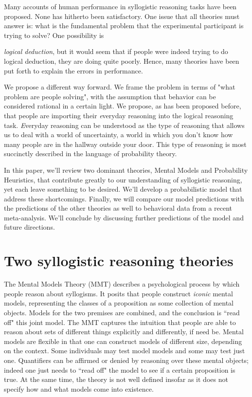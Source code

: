 \documentclass[10pt,letterpaper]{article}
\begin{document}
Many accounts of human performance in syllogistic reasoning tasks have been proposed. None has hitherto been satisfactory. One issue that all theories must answer is: what is the fundamental problem that the experimental participant is trying to solve? One possibility is {\emph{logical deduction}, but it would seem that if people were indeed trying to do logical deduction, they are doing quite poorly. Hence, many theories have been put forth to explain the errors in performance.

We propose a different way forward. We frame the problem in terms of "what problem are people solving", with the assumption that behavior can be considered rational in a certain light. We propose, as has been proposed before, that people are importing their {\emph everyday} reasoning into the logical reasoning task. {\emph Everyday} reasoning can be understood as the type of reasoning that allows us to deal with a world of uncertainty, a world in which you don't know how many people are in the hallway outside your door. This type of reasoning is most succinctly described in the language of probability theory. 

In this paper, we'll review two dominant theories, Mental Models and Probability Heuristics, that contribute greatly to our understanding of syllogistic reasoning, yet each leave something to be desired. We'll develop a probabilistic model that address these shortcomings.  Finally, we will compare our model predictions with the predictions of the other theories as well to behavioral data from a recent meta-analysis. We'll conclude by discussing further predictions of the model and future directions.  


\section{Two syllogistic reasoning theories}

The Mental Models Theory (MMT) describes a psychological process by which people reason about syllogisms. It posits that people construct {\em iconic} mental models, representing the classes of a proposition as some collection of mental objects. Models for the two premises are combined, and the conclusion is ``read off" this joint model. The MMT captures the intuition that people are able to reason about sets of different things explicitly and differently, if need be. Mental models are flexible in that one can construct models of different size, depending on the context. Some individuals may test model models and some may test just one. Quantifiers can be affirmed or denied by reasoning over these mental objects; indeed one just needs to ``read off" the model to see if a certain proposition is true. At the same time, the theory is not well defined insofar as it does not specify how and what models come into existence.

}
\end{document}
